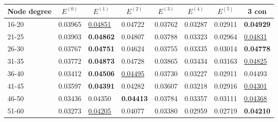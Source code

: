 \begin{table*}[]
    \centering
    \begin{tabular}{|l|l|l|l|l|l|l||l|}
        \hline
        Node degree & \multicolumn{1}{c|}{$E^{(0)}$} & \multicolumn{1}{c|}{$E^{(1)}$} & \multicolumn{1}{c|}{$E^{(2)}$} & \multicolumn{1}{c|}{$E^{(3)}$} & \multicolumn{1}{c|}{$E^{(4)}$} & \multicolumn{1}{c|}{$E^{(5)}$} & \multicolumn{1}{c|}{3 con} \\ \hline
        16-20       & 0.03965                        & \underline{0.04851}            & 0.04722                        & 0.03762                        & 0.03287                        & 0.02911                        & \textbf{0.04929}           \\ \hline
        21-25       & 0.03903                        & \textbf{0.04862}               & 0.04807                        & 0.03788                        & 0.03323                        & 0.02964                        & \underline{0.04831}        \\ \hline
        26-30       & 0.03767                        & \textbf{0.04751}               & 0.04624                        & 0.03755                        & 0.03335                        & 0.03014                        & \textbf{0.04778}           \\ \hline
        31-35       & 0.03772                        & \textbf{0.04873}               & 0.04728                        & 0.03865                        & 0.03434                        & 0.03163                        & \underline{0.04825}        \\ \hline
        36-40       & 0.03412                        & \textbf{0.04506}               & \underline{0.04495}            & 0.03730                        & 0.03227                        & 0.02911                        & 0.04493                    \\ \hline
        41-45       & 0.03597                        & \textbf{0.04391}               & 0.04282                        & 0.03607                        & 0.03218                        & 0.02916                        & \underline{0.04301}        \\ \hline
        46-50       & 0.03436                        & 0.04350                        & \textbf{0.04413}               & 0.03784                        & 0.03357                        & 0.03111                        & \underline{0.04368}        \\ \hline
        51-60       & 0.03273                        & \underline{0.04205}            & 0.04077                        & 0.03380                        & 0.02959                        & 0.02719                        & \textbf{0.04210}           \\ \hline

\end{tabular}
\end{table*}
